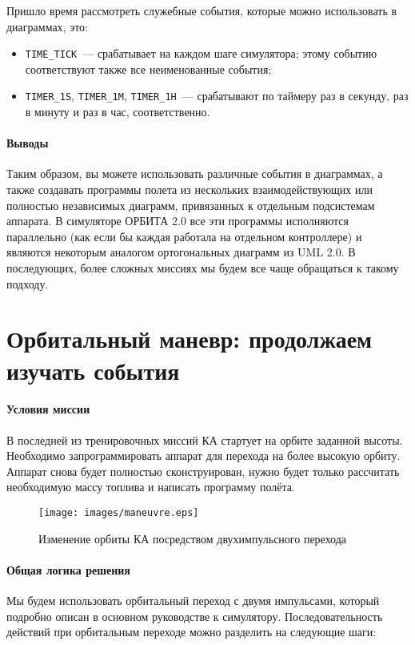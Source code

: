 \documentclass[12pt,a4paper]{article}
\begin{document}
Пришло время рассмотреть служебные события, которые можно использовать в диаграммах, это:

\begin{itemize}
\item \verb'TIME_TICK'~--- срабатывает на каждом шаге симулятора; этому событию соответствуют
  также все неименованные события;
\item \verb'TIMER_1S', \verb'TIMER_1M', \verb'TIMER_1H'~--- срабатывают по таймеру раз в
  секунду, раз в минуту и раз в час, соответственно.
\end{itemize}

\paragraph{Выводы} Таким образом, вы можете использовать различные события в диаграммах, а
также создавать программы полета из нескольких взаимодействующих или полностью независимых
диаграмм, привязанных к отдельным подсистемам аппарата. В симуляторе ОРБИТА 2.0 все эти
программы исполняются параллельно (как если бы каждая работала на отдельном контроллере) и
являются некоторым аналогом ортогональных диаграмм из UML 2.0. В последующих, более
сложных миссиях мы будем все чаще обращаться к такому подходу.

\clearpage
\section{Орбитальный маневр: продолжаем изучать события}

\paragraph{Условия миссии} В последней из тренировочных миссий КА стартует на орбите
заданной высоты. Необходимо запрограммировать аппарат для перехода на более высокую
орбиту. Аппарат снова будет полностью сконструирован, нужно будет только рассчитать
необходимую массу топлива и написать программу полёта.

\begin{figure}[tbh]
  \begin{center}
    \texttt{[image: images/maneuvre.eps]}
    \caption{Изменение орбиты КА посредством двухимпульсного перехода}
    \label{Pic:Maneuvre}
  \end{center}
\end{figure}

\paragraph{Общая логика решения} Мы будем использовать орбитальный переход с двумя
импульсами, который подробно описан в основном руководстве к
симулятору. Последовательность действий при орбитальным переходе можно разделить на
следующие шаги:
\end{document}
